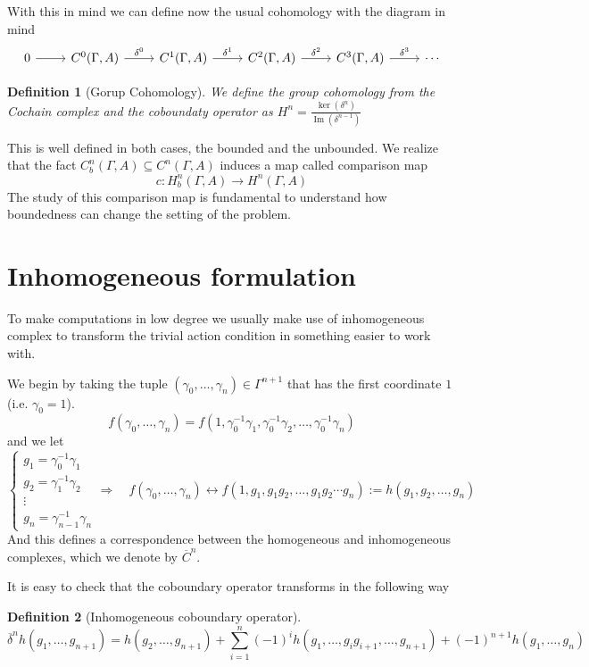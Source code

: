 \documentclass[leqno]{article}
\DeclareMathOperator{\im}{Im}
\newtheorem*{definition}{Definition}
\begin{document}
With this in mind we can define now the usual cohomology with the diagram in mind
\[\begin{tikzcd}
	0 & {C^0(\Gamma, A)} & {C^1(\Gamma, A)} & {C^2(\Gamma, A)} & {C^3(\Gamma, A)} & \cdots
	\arrow[from=1-1, to=1-2]
	\arrow["{\delta^0}", from=1-2, to=1-3]
	\arrow["{\delta^1}", from=1-3, to=1-4]
	\arrow["{\delta^2}", from=1-4, to=1-5]
	\arrow["{\delta^3}", from=1-5, to=1-6]
\end{tikzcd}\]

\begin{definition}[Gorup Cohomology] We define the group cohomology from the Cochain complex and the coboundaty operator as $\displaystyle H^n = \frac{\ker(\delta^n)}{\im(\delta^{n-1})}$
\end{definition}

This is well defined in both cases, the bounded and the unbounded. We realize that the fact $C_b^n(\Gamma , A)\subseteq C^n(\Gamma , A)$ induces a map called comparison map
\[
c: H_b^n(\Gamma , A) \to  H^n(\Gamma , A)
\] 
The study of this comparison map is fundamental to understand how boundedness can change the setting of the problem.

\section{Inhomogeneous formulation}
To make computations in low degree we usually make use of inhomogeneous complex to transform the trivial action condition in something easier to work with.

We begin by taking the tuple $(\gamma_0, \ldots, \gamma_n)\in \Gamma ^{n+1}$ that has the first coordinate  $1$ (i.e. $\gamma_0=1$). 
 \[
f(\gamma_0, \ldots, \gamma_n) = f(1, \gamma_0^{-1}\gamma_1, \gamma_0^{-1}\gamma_2, \ldots, \gamma_0^{-1} \gamma_n)
\] 
and we let
\[
\begin{cases}
 g_1 = \gamma_0^{-1}\gamma_1\\
 g_2 = \gamma_1^{-1}\gamma_2\\
 \vdots\\
 g_n = \gamma_{n-1}^{-1} \gamma_n
\end{cases}
\Rightarrow \quad
f(\gamma_0, \ldots, \gamma_n) 
\leftrightarrow f(1, g_1, g_1g_2, \ldots, g_1g_2\cdots g_n) := h(g_1, g_2, \ldots, g_n)
\] 
And this defines a correspondence between the homogeneous and inhomogeneous complexes, which we denote by $\overline{C}^n$.

It is easy to check that the coboundary operator transforms in the following way 
\begin{definition}[Inhomogeneous coboundary operator]
  \[
	\overline{\delta}^nh(g_1, \ldots, g_{n+1}) = h(g_2, \ldots, g_{n+1}) + \sum_{i=1}^n (-1)^ih(g_1, \ldots, g_ig_{i+1}, \ldots, g_{n+1}) + (-1)^{n+1}h(g_1, \ldots, g_n)
  \] 
\end{definition}
\end{document}
